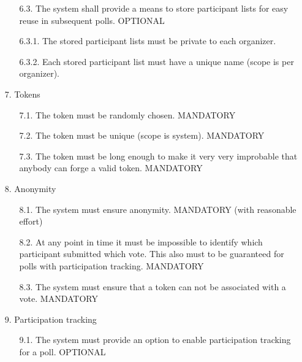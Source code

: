 \begin{enumerate}
\begin{enumerate}
	
	\item[6.3.] The system shall provide a means to store participant lists for easy reuse in subsequent
	polls. OPTIONAL
	
	
	\item[6.3.1.] The stored participant lists must be private to each organizer.
	
	
	\item[6.3.2.] Each stored participant list must have a unique name (scope is per organizer).
	\end{enumerate}





\item[7.] Tokens

	\begin{enumerate}
	\item[7.1.] The token must be randomly chosen. MANDATORY
	
	
	\item[7.2.] The token must be unique (scope is system). MANDATORY
	
	
	\item[7.3.] The token must be long enough to make it very very improbable that anybody can forge a
	valid token. MANDATORY
	\end{enumerate}




\item[8.] Anonymity

	\begin{enumerate}
	\item[8.1.] The system must ensure anonymity. MANDATORY (with reasonable effort)
	
	
	\item[8.2.] At any point in time it must be impossible to identify which participant submitted which vote.
	This also must to be guaranteed for polls with participation tracking. MANDATORY
	
	
	\item[8.3.] The system must ensure that a token can not be associated with a vote. MANDATORY
	\end{enumerate}



\item[9.] Participation tracking

	\begin{enumerate}
	\item[9.1.] The system must provide an option to enable participation tracking for a poll. OPTIONAL
	

\end{enumerate}
\end{enumerate}
